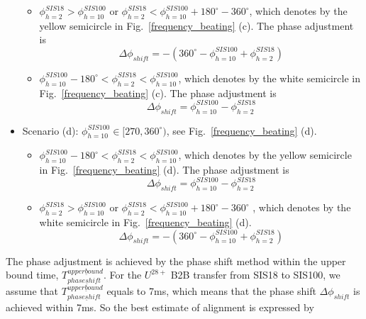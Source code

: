 \begin{itemize}
	\begin{itemize}
		\item $\phi_{h=2}^{SIS18} > \phi_{h=10}^{SIS100}$ or  $\phi_{h=2}^{SIS18} < \phi_{h=10}^{SIS100} +180^\circ - 360^\circ $, which denotes by the yellow semicircle in Fig.~\ref{frequency_beating} (c). The phase adjustment is
    \begin{equation}			
\Delta \phi_{shift}=-(360^\circ - \phi_{h=10}^{SIS100}+ \phi_{h=2}^{SIS18})
    \end{equation}
    		\item $\phi_{h=10}^{SIS100}-180^\circ < \phi_{h=2}^{SIS18}< \phi_{h=10}^{SIS100}$, which denotes by the white semicircle in Fig.~\ref{frequency_beating} (c). The phase adjustment is
    \begin{equation}			
\Delta \phi_{shift}=\phi_{h=10}^{SIS100}-\phi_{h=2}^{SIS18}
    \end{equation}
	\end{itemize}
    \item Scenario (d): $\phi_{h=10}^{SIS100}\in [270,360^\circ)$, see Fig.~\ref{frequency_beating} (d).

	\begin{itemize}
		\item $\phi_{h=10}^{SIS100}-180^\circ < \phi_{h=2}^{SIS18}< \phi_{h=10}^{SIS100}$, which denotes by the yellow semicircle in Fig.~\ref{frequency_beating} (d). The phase adjustment is 
	    \begin{equation}	
\Delta \phi_{shift}=\phi_{h=10}^{SIS100}-\phi_{h=2}^{SIS18}	
    \end{equation}
    		\item $\phi_{h=2}^{SIS18} > \phi_{h=10}^{SIS100}$ or  $\phi_{h=2}^{SIS18} < \phi_{h=10}^{SIS100} +180^\circ - 360^\circ $ , which denotes by the white semicircle in Fig.~\ref{frequency_beating} (d). 
    \begin{equation}			
\Delta \phi_{shift}=-(360^\circ - \phi_{h=10}^{SIS100}+ \phi_{h=2}^{SIS18})
    \end{equation}
	\end{itemize}
\end{itemize}

The phase adjustment is achieved by the phase shift method within the upper bound time, $T_{phase\underline shift}^{upper\underline bound}$. For the $U^{28+}$ B2B transfer from SIS18 to SIS100, we assume that $T_{phase\underline shift}^{upper\underline bound}$ equals to 7ms, which means that the phase shift $\Delta \phi_{shift}$ is achieved within 7ms. So the best estimate of alignment is expressed by 

